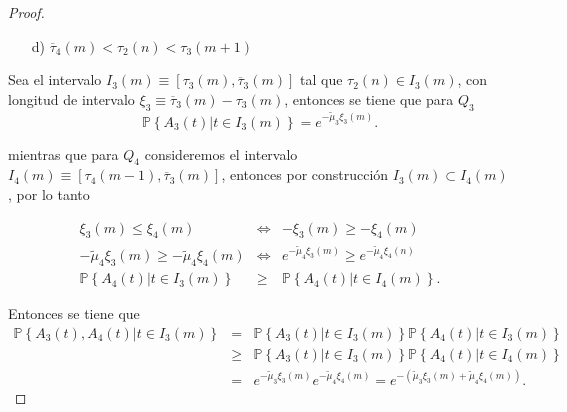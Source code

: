 \documentclass{article}
\newcommand{\prob}{\mathbb{P}}
\begin{document}
\begin{proof}
\begin{itemize}
\item[d)] $\overline{\tau}_{4}\left(m\right)<\tau_{2}\left(n\right)
<\tau_{3}\left(m+1\right)$
\end{itemize}


Sea el intervalo $I_{3}\left(m\right)\equiv\left[\tau_{3}\left(m\right),\overline{\tau}_{3}\left(m\right)\right]$ tal que $\tau_{2}\left(n\right)\in I_{3}\left(m\right)$, con longitud de intervalo $\xi_{3}\equiv\overline{\tau}_{3}\left(m\right)-\tau_{3}\left(m\right)$, entonces se tiene que para $Q_{3}$
\begin{equation}
\prob\left\{A_{3}\left(t\right)|t\in I_{3}\left(m\right)\right\}=e^{-\tilde{\mu}_{3}\xi_{3}\left(m\right)}.
\end{equation} 

mientras que para $Q_{4}$ consideremos el intervalo $I_{4}\left(m\right)\equiv\left[\tau_{4}\left(m-1\right),\overline{\tau}_{3}\left(m\right)\right]$, entonces por construcci\'on  $I_{3}\left(m\right)\subset I_{4}\left(m\right)$, por lo tanto


\begin{eqnarray*}
\xi_{3}\left(m\right)\leq\xi_{4}\left(m\right)&\Leftrightarrow& -\xi_{3}\left(m\right)\geq-\xi_{4}\left(m\right)
\\
-\tilde{\mu}_{4}\xi_{3}\left(m\right)\geq-\tilde{\mu}_{4}\xi_{4}\left(m\right)&\Leftrightarrow&
e^{-\tilde{\mu}_{4}\xi_{3}\left(m\right)}\geq e^{-\tilde{\mu}_{4}\xi_{4}\left(n\right)}\\
\prob\left\{A_{4}\left(t\right)|t\in I_{3}\left(m\right)\right\}&\geq&
\prob\left\{A_{4}\left(t\right)|t\in I_{4}\left(m\right)\right\}.
\end{eqnarray*}



Entonces se tiene que
\small{
\begin{eqnarray*}
\prob\left\{A_{3}\left(t\right),A_{4}\left(t\right)|t\in I_{3}\left(m\right)\right\}&=&
\prob\left\{A_{3}\left(t\right)|t\in I_{3}\left(m\right)\right\}
\prob\left\{A_{4}\left(t\right)|t\in I_{3}\left(m\right)\right\}\\
&\geq&
\prob\left\{A_{3}\left(t\right)|t\in I_{3}\left(m\right)\right\}
\prob\left\{A_{4}\left(t\right)|t\in I_{4}\left(m\right)\right\}\\
&=&e^{-\tilde{\mu}_{3}\xi_{3}\left(m\right)}e^{-\tilde{\mu}_{4}\xi_{4}
\left(m\right)}
=e^{-\left(\tilde{\mu}_{3}\xi_{3}\left(m\right)+\tilde{\mu}_{4}\xi_{4}\left(m\right)\right)}.
\end{eqnarray*}}


\end{proof}
\end{document}
